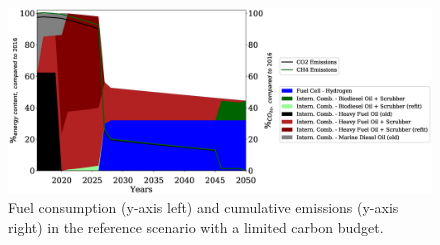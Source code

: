 \documentclass[article]{elsarticle}
\begin{document}
\begin{figure}
    \centering
    \includegraphics[width=\textwidth]{figures/RS_fuels_emissions.eps}
    \caption{Fuel consumption (y-axis left) and cumulative emissions (y-axis right) in the reference scenario with a limited carbon budget.}
    \label{fig:REF}
\end{figure}



\end{document}
